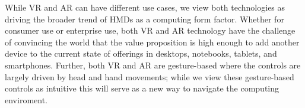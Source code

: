 \documentclass[preprint,12pt]{elsarticle}
\begin{document}

While VR and AR can have different use cases, we view both technologies as driving the broader trend of HMDs as a computing form factor. Whether for consumer use or enterprise use, both VR and AR technology have the challenge of convincing the world that the value proposition is high enough to add another device to the current state of offerings in desktops, notebooks, tablets, and smartphones. Further, both VR and AR are gesture-based where the controls are largely driven by head and hand movements; while we view these gesture-based controls as intuitive this will serve as a new way to navigate the computing enviroment.
\end{document}

